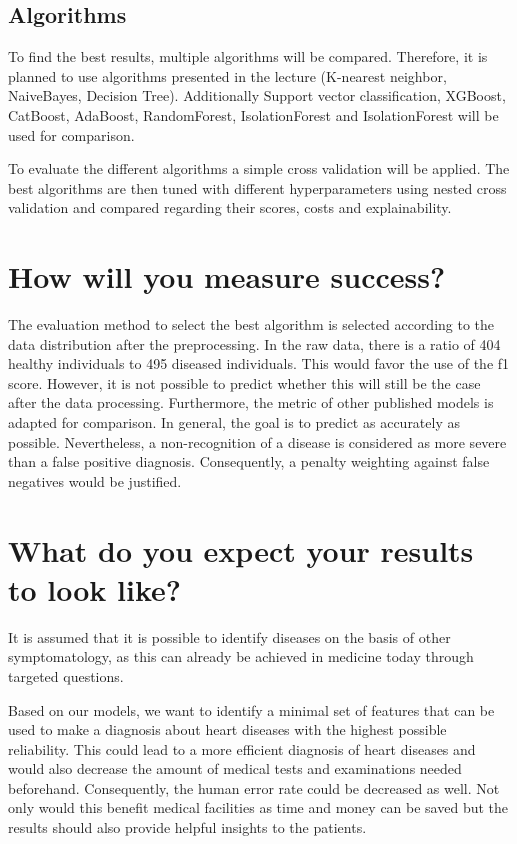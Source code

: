 \documentclass[11pt,titlepage,oneside,openany]{article}
\begin{document}
\subsection{Algorithms}

To find the best results, multiple algorithms will be compared. Therefore, it is planned to use algorithms presented in the lecture (K-nearest neighbor, NaiveBayes, Decision Tree). Additionally Support vector classification, XGBoost, CatBoost, AdaBoost, RandomForest, IsolationForest and IsolationForest  will be used for comparison.

To evaluate the different algorithms a simple cross validation will be applied. The best algorithms are then tuned with different hyperparameters using nested cross validation and compared regarding their scores, costs and explainability. 

\section{How will you measure success?}
\label{sec:success}

The evaluation method to select the best algorithm is selected according to the data distribution after the  preprocessing. In the raw data, there is a ratio of 404 healthy individuals to 495 diseased individuals. This would favor the use of the f1 score. However, it is not possible to predict whether this will still be the case after the data processing. 
Furthermore, the metric of other published models is adapted for  comparison. 
In general, the goal is to predict as accurately as possible. Nevertheless, a non-recognition of a disease is considered as more severe than a false positive diagnosis. Consequently, a penalty weighting against false negatives would be justified.

\newpage
\section{What do you expect your results to look like?}
\label{sec:results}

It is assumed that it is possible to identify diseases on the basis of other symptomatology, as this can already be achieved in medicine today through targeted questions. 

Based on our models, we want to identify a minimal set of features that can be used to make a diagnosis about heart diseases with the highest possible reliability. This could lead to a more efficient diagnosis of heart diseases and would also decrease the amount of medical tests and examinations needed beforehand. Consequently, the human error rate could be decreased as well. 
Not only would this benefit medical facilities as time and money can be saved but the results should also provide helpful insights to the patients.
\end{document}
